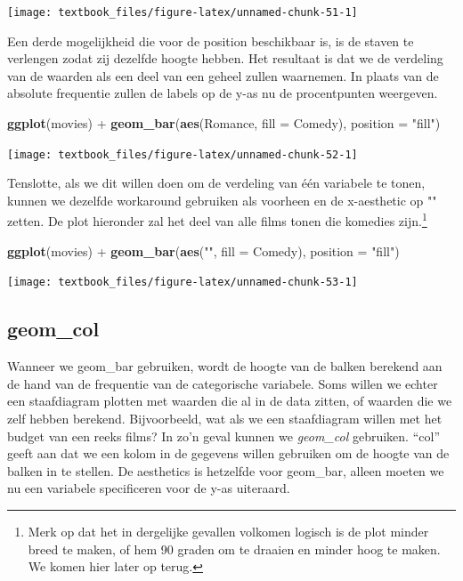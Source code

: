 \documentclass[]{tufte-book}
\newenvironment{Shaded}{}{}
\newcommand{\DataTypeTok}[1]{\textcolor[rgb]{0.56,0.13,0.00}{#1}}
\newcommand{\KeywordTok}[1]{\textcolor[rgb]{0.00,0.44,0.13}{\textbf{#1}}}
\newcommand{\NormalTok}[1]{#1}
\newcommand{\OperatorTok}[1]{\textcolor[rgb]{0.40,0.40,0.40}{#1}}
\newcommand{\StringTok}[1]{\textcolor[rgb]{0.25,0.44,0.63}{#1}}
\begin{document}
\texttt{[image: textbook\_files/figure-latex/unnamed-chunk-51-1]}

Een derde mogelijkheid die voor de position beschikbaar is, is de staven te verlengen zodat zij dezelfde hoogte hebben. Het resultaat is dat we de verdeling van de waarden als een deel van een geheel zullen waarnemen. In plaats van de absolute frequentie zullen de labels op de y-as nu de procentpunten weergeven.

\begin{Shaded}
\begin{Highlighting}[]
\KeywordTok{ggplot}\NormalTok{(movies) }\OperatorTok{+}
\StringTok{    }\KeywordTok{geom_bar}\NormalTok{(}\KeywordTok{aes}\NormalTok{(Romance, }\DataTypeTok{fill =}\NormalTok{ Comedy), }\DataTypeTok{position =} \StringTok{"fill"}\NormalTok{) }
\end{Highlighting}
\end{Shaded}

\texttt{[image: textbook\_files/figure-latex/unnamed-chunk-52-1]}

Tenslotte, als we dit willen doen om de verdeling van één variabele te tonen, kunnen we dezelfde workaround gebruiken als voorheen en de x-aesthetic op "" zetten. De plot hieronder zal het deel van alle films tonen die komedies zijn.\footnote{Merk op dat het in dergelijke gevallen volkomen logisch is de plot minder breed te maken, of hem 90 graden om te draaien en minder hoog te maken. We komen hier later op terug.}

\begin{Shaded}
\begin{Highlighting}[]
\KeywordTok{ggplot}\NormalTok{(movies) }\OperatorTok{+}
\StringTok{    }\KeywordTok{geom_bar}\NormalTok{(}\KeywordTok{aes}\NormalTok{(}\StringTok{""}\NormalTok{, }\DataTypeTok{fill =}\NormalTok{ Comedy), }\DataTypeTok{position =} \StringTok{"fill"}\NormalTok{) }
\end{Highlighting}
\end{Shaded}

\texttt{[image: textbook\_files/figure-latex/unnamed-chunk-53-1]}

\hypertarget{geom_col}{%
\subsection{geom\_col}\label{geom_col}}

Wanneer we geom\_bar gebruiken, wordt de hoogte van de balken berekend aan de hand van de frequentie van de categorische variabele. Soms willen we echter een staafdiagram plotten met waarden die al in de data zitten, of waarden die we zelf hebben berekend. Bijvoorbeeld, wat als we een staafdiagram willen met het budget van een reeks films? In zo'n geval kunnen we \emph{geom\_col} gebruiken. ``col'' geeft aan dat we een kolom in de gegevens willen gebruiken om de hoogte van de balken in te stellen. De aesthetics is hetzelfde voor geom\_bar, alleen moeten we nu een variabele specificeren voor de y-as uiteraard.
\end{document}
